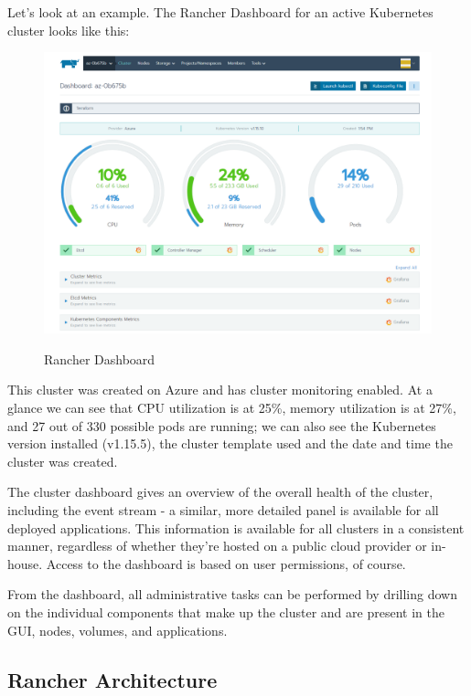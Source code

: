 Let's look at an example. The Rancher Dashboard for an active Kubernetes cluster looks like this:

\begin{figure}[H]
\centering
\caption {Rancher Dashboard}
\includegraphics[width=\linewidth]{images/dashboard}
\label{fig:rancherDashboard}
\end{figure}

This cluster was created on Azure and has cluster monitoring enabled. At a glance we can see that CPU utilization is at 25\%, memory utilization is at 27\%, and 27 out of 330 possible pods are running; we can also see the Kubernetes version installed (v1.15.5), the cluster template used and the date and time the cluster was created.

The cluster dashboard gives an overview of the overall health of the cluster, including the event stream - a similar, more detailed panel is available for all deployed applications. This information is available for all clusters in a consistent manner, regardless of whether they're hosted on a public cloud provider or in-house. Access to the dashboard is based on user permissions, of course.

From the dashboard, all administrative tasks can be performed by drilling down on the individual components that make up the cluster and are present in the GUI, nodes, volumes, and applications.

\subsection{Rancher Architecture}

